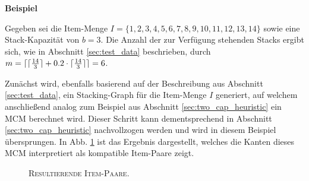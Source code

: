 \vfill
\pagebreak

\textbf{Beispiel}

Gegeben sei die Item-Menge $I = \{1, 2, 3, 4, 5, 6, 7, 8, 9, 10, 11, 12, 13, 14\}$ sowie eine Stack-Kapazität von $b = 3$.
Die Anzahl der zur Verfügung stehenden Stacks ergibt sich, wie in Abschnitt \ref{sec:test_data} beschrieben,
durch $m = \lceil\lceil\frac{14}{3}\rceil + 0.2 \cdot  \lceil\frac{14}{3}\rceil\rceil = 6$.

Zunächst wird, ebenfalls basierend auf der Beschreibung aus Abschnitt \ref{sec:test_data}, ein Stacking-Graph
für die Item-Menge $I$ generiert, auf welchem anschließend analog zum Beispiel aus Abschnitt \ref{sec:two_cap_heuristic} ein
\textsc{MCM} berechnet wird. Dieser Schritt kann dementsprechend in Abschnitt \ref{sec:two_cap_heuristic} nachvollzogen werden
und wird in diesem Beispiel übersprungen. In Abb. \ref{fig:item_pairs_example_b=3} ist das Ergebnis dargestellt,
welches die Kanten dieses \textsc{MCM} interpretiert als kompatible Item-Paare zeigt.

\begin{figure}[H]
\centering
{}
\caption{\textsc{Resultierende Item-Paare}.}
\label{fig:item_pairs_example_b=3}
\end{figure}

